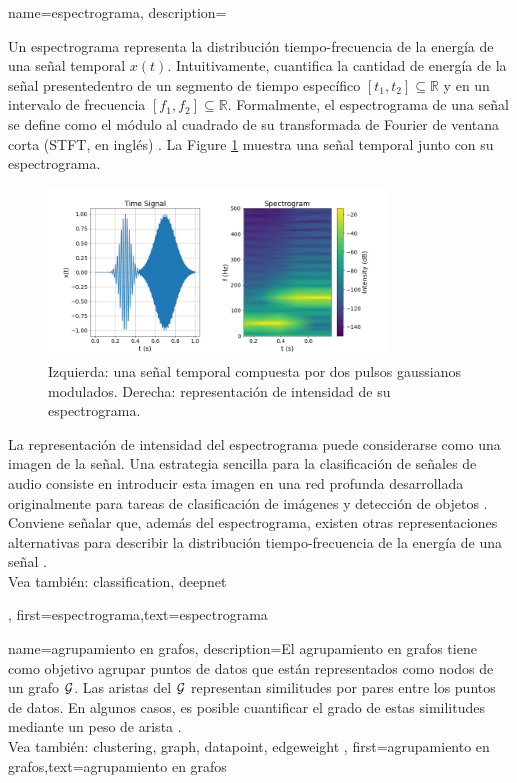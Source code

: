 {name={espectrograma},
	description={
		Un espectrograma representa la distribución tiempo-frecuencia de la energía de una señal temporal $x(t)$.  
		Intuitivamente, cuantifica la cantidad de energía de la señal presentedentro de un segmento de tiempo específico 
		$[t_{1},t_{2}] \subseteq \mathbb{R}$ y en un intervalo de frecuencia $[f_{1},f_{2}]\subseteq \mathbb{R}$. 
		Formalmente, el espectrograma de una señal se define como el módulo al cuadrado de su transformada
		de Fourier de ventana corta (STFT, en inglés) \cite{cohen1995time}.
        La Figure \ref{fig:spectrogram_dict} muestra una señal temporal junto con su espectrograma. 
	\begin{figure}[H]
		\centering
		\includegraphics[width=0.8\textwidth]{../../assets/spectrogram.png}
		\caption{Izquierda: una señal temporal compuesta por dos pulsos gaussianos modulados. Derecha: representación de intensidad de su espectrograma.
		\label{fig:spectrogram_dict}}
	\end{figure}
		La representación de intensidad del espectrograma puede considerarse como una imagen de la señal. 
		Una estrategia sencilla para la clasificación de señales de audio consiste en introducir esta imagen en una 
		red profunda desarrollada originalmente para tareas de clasificación de imágenes y detección de objetos \cite{Li:2022aa}. 
		Conviene señalar que, además del espectrograma, existen otras representaciones alternativas para describir la distribución 
		tiempo-frecuencia de la energía de una señal \cite{TimeFrequencyAnalysisBoashash,MallatBook}. 
		\\
		Vea también: \gls{classification}, \gls{deepnet} }, 
	first={espectrograma},text={espectrograma} 
}

{name={agrupamiento en grafos},
	description={El agrupamiento en grafos tiene como objetivo agrupar puntos de datos que están representados como nodos de un grafo $\mathcal{G}$.
		Las aristas del $\mathcal{G}$ representan similitudes por pares entre los puntos de datos. 
		En algunos casos, es posible cuantificar el grado de estas similitudes mediante un peso de arista \cite{Luxburg2007,FlowSpecClustering2021}. 
		\\
		Vea también: \gls{clustering}, \gls{graph}, \gls{datapoint}, \gls{edgeweight} }, 
	first={agrupamiento en grafos},text={agrupamiento en grafos} 
}

